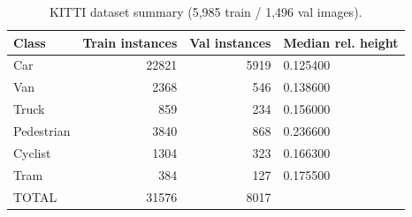 \begin{table}
\caption{KITTI dataset summary (5,985 train / 1,496 val images).}
\label{tab:dataset}
\begin{tabular}{lrrl}
\toprule
Class & Train instances & Val instances & Median rel. height \\
\midrule
Car & 22821 & 5919 & 0.125400 \\
Van & 2368 & 546 & 0.138600 \\
Truck & 859 & 234 & 0.156000 \\
Pedestrian & 3840 & 868 & 0.236600 \\
Cyclist & 1304 & 323 & 0.166300 \\
Tram & 384 & 127 & 0.175500 \\
TOTAL & 31576 & 8017 &  \\
\bottomrule
\end{tabular}
\end{table}
